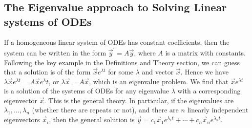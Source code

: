 \subsection{The Eigenvalue approach to Solving Linear systems of ODEs}

If a homogeneous linear system of ODEs has constant coefficients, then the system can be written in the form $\vec y^\prime = A\vec y$, where $A$ is a matrix with constants.  Following the key example in the Definitions and Theory section, we can guess that a solution is of the form $\vec xe^{\lambda t}$ for some $\lambda$ and vector $\vec x$. Hence we have $\lambda \vec x e^{\lambda t}=A\vec x e^\lambda t $, or $\lambda \vec x =A\vec x $, which is an eigenvalue problem. We find that $\vec x e^{\lambda t}$ is a solution of the systems of ODEs for any eigenvalue $\lambda$ with a corresponding eigenvector $\vec x$. This is the general theory.  In particular, if the eigenvalues are $\lambda_1,\ldots,\lambda_n$ (whether there are repeats or not), and there are $n$ linearly independent eigenvectors $\vec x_{i}$, then the general solution is $\vec y = c_1\vec x_{1} e^{\lambda_1 t} + \cdots + c_n\vec x_{n} e^{\lambda_n t}$. 

